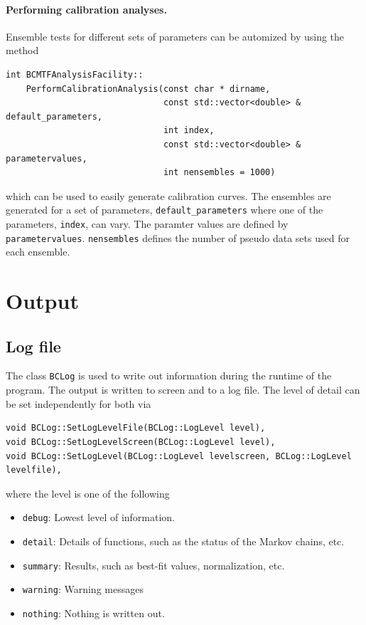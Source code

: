 \documentclass[11pt, a4paper]{article}
\begin{document}
\paragraph{Performing calibration analyses.}

Ensemble tests for different sets of parameters can be automized by
using the method
%
\begin{verbatim}
int BCMTFAnalysisFacility::
    PerformCalibrationAnalysis(const char * dirname,
                               const std::vector<double> & default_parameters,
                               int index,
                               const std::vector<double> & parametervalues,
                               int nensembles = 1000)
\end{verbatim}
%
which can be used to easily generate calibration curves. The ensembles
are generated for a set of parameters, \verb|default_parameters| where
one of the parameters, \verb|index|, can vary. The paramter values are
defined by \verb|parametervalues|. \verb|nensembles| defines the
number of pseudo data sets used for each ensemble.




\clearpage
\pagebreak

\section{Output}
\label{section:output}

\subsection{Log file}
\label{subsection:logfile}

The class \verb|BCLog| is used to write out information during the
runtime of the program. The output is written to screen and to a log
file. The level of detail can be set independently for both
via
%
\begin{verbatim}
void BCLog::SetLogLevelFile(BCLog::LogLevel level),
void BCLog::SetLogLevelScreen(BCLog::LogLevel level),
void BCLog::SetLogLevel(BCLog::LogLevel levelscreen, BCLog::LogLevel levelfile),
\end{verbatim}
%
where the level is one of the following
%
\begin{itemize}
\item \verb|debug|: Lowest level of information.
\item \verb|detail|: Details of functions, such as the status of the
  Markov chains, etc.
\item \verb|summary|: Results, such as best-fit values, normalization, etc.
\item \verb|warning|: Warning messages
\item \verb|nothing|: Nothing is written out.
\end{itemize}
\end{document}
